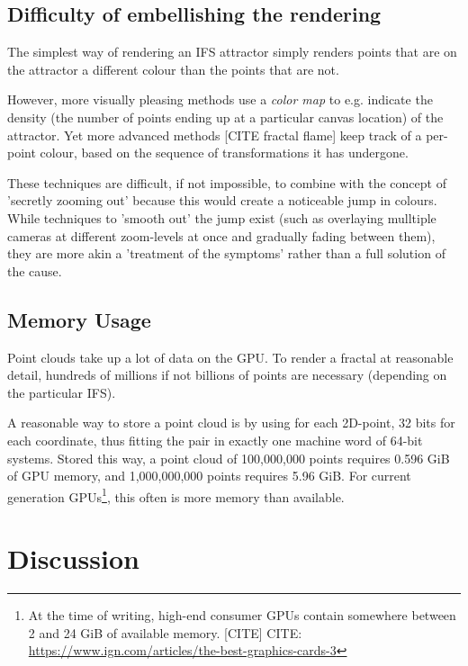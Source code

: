 \documentclass[11pt]{article}
\begin{document}
\subsection{Difficulty of embellishing the rendering}
\label{sec:org90ebb89}

The simplest way of rendering an IFS attractor simply renders points that are on the attractor a different colour
than the points that are not.

However, more visually pleasing methods use a \emph{color map} to e.g. indicate the density (the number of points ending up at a particular canvas location) of the attractor.
Yet more advanced methods [CITE fractal flame] keep track of a per-point colour, based on the sequence of transformations it has undergone.

These techniques are difficult, if not impossible, to combine with the concept of 'secretly zooming out' because this would create a noticeable jump in colours.
While techniques to 'smooth out' the jump exist (such as overlaying mulltiple cameras at different zoom-levels at once and gradually fading between them),
they are more akin a 'treatment of the symptoms' rather than a full solution of the cause.

\subsection{Memory Usage}
\label{sec:orgb2b82d5}

Point clouds take up a lot of data on the GPU. To render a fractal at reasonable detail, 
hundreds of millions if not billions of points are necessary (depending on the particular IFS).

A reasonable way to store a point cloud is by using for each 2D-point, 32 bits for each coordinate, thus fitting the pair in exactly one machine word of 64-bit systems.
Stored this way, a point cloud of 100,000,000 points requires 0.596 GiB of GPU memory,
and 1,000,000,000 points requires 5.96 GiB.
For current generation GPUs\footnote{At the time of writing, high-end consumer GPUs contain somewhere between 2 and 24 GiB of available memory. [CITE]
CITE: \url{https://www.ign.com/articles/the-best-graphics-cards-3}}, this often is more memory than available.

\section{Discussion}
\label{sec:org09753ed}
\end{document}
